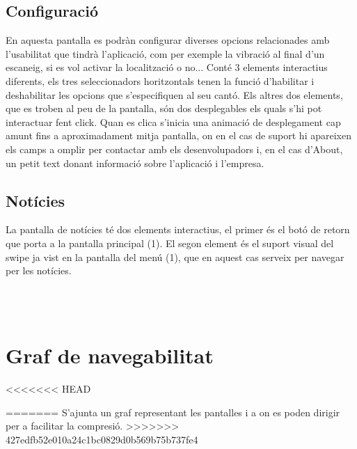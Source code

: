 \documentclass{article}
\begin{document}
\subsection{Configuració}
En aquesta pantalla es podràn configurar 
diverses opcions relacionades amb l'usabilitat 
que tindrà l'aplicació, com per 
exemple la vibració al final d'un escaneig, 
si es vol activar la localització o no...
Conté 3 elements interactius diferents, 
els tres seleccionadors horitzontals 
tenen la funció d'habilitar i deshabilitar les 
opcions que s'especifiquen al seu cantó. 
Els altres dos elements, que es troben al peu de la pantalla,
són dos desplegables els quals s'hi pot interactuar fent click. Quan es clica
s'inicia una animació de desplegament cap amunt fins a aproximadament
mitja pantalla, on en el cas de suport hi apareixen els camps a omplir
per contactar amb els desenvolupadors i, en el cas d'About, un petit text donant 
informació sobre l'aplicació i l'empresa.

\subsection{Notícies}
La pantalla de notícies té dos elements interactius, el 
primer és el botó de retorn que porta a la pantalla principal (1).
El segon element és el suport visual del swipe ja
vist en la pantalla del menú (1), que en aquest cas serveix per navegar per
les notícies.

\\\\

\section{Graf de navegabilitat}
<<<<<<< HEAD

=======
S'ajunta un graf representant les pantalles i 
a on es poden dirigir per a facilitar la compresió.
>>>>>>> 427edfb52e010a24c1bc0829d0b569b75b737fe4

\end{document}
